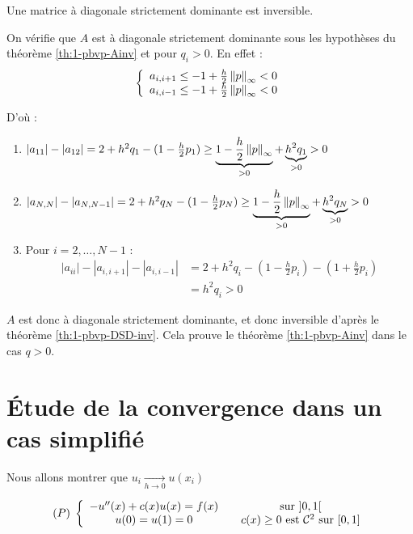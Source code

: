     \begin{ftheo}
        Une matrice à diagonale strictement dominante est inversible.
        \label{th:1-pbvp-DSD-inv}
    \end{ftheo}

    On vérifie que $A$ est à diagonale strictement dominante sous les hypothèses
    du théorème \ref{th:1-pbvp-Ainv} et pour $q_i>0$. En effet :
    \[
        \left\lbrace
        \begin{array}{c}
            a_{i,i+1} \leq -1 + \frac{h}{2} \left\lVert p\right\rVert_\infty < 0 \\
            a_{i,i-1} \leq -1 + \frac{h}{2} \left\lVert p\right\rVert_\infty < 0
        \end{array}
        \right.
    \]

    D'où :
    \begin{enumerate}[label=*]
        \item $|a_{11}| - |a_{12}| = 2 + h^2 q_1 - (1 - \frac{h}{2}p_1) \geq
            \underbrace{1 - \frac{h}{2} \left\lVert p\right\rVert_\infty}_{>0} + \underbrace{h^2 q_1}_{>0} > 0 $

        \item $|a_{N,N}| - |a_{N,N-1}| = 2 + h^2 q_N - (1 - \frac{h}{2}p_N) \geq
            \underbrace{1 - \frac{h}{2} \left\lVert p\right\rVert_\infty}_{>0} + \underbrace{h^2 q_N}_{>0} > 0 $

        \item Pour $i = 2, \dots, N-1$ :
            \begin{align*}
                |a_{ii}| - |a_{i,i+1}| - |a_{i,i-1}| & = 2 + h^2 q_i - (1-\frac{h}{2}p_i) - (1 + \frac{h}{2}p_i) \\
                & = h^2 q_i > 0
            \end{align*}
    \end{enumerate}

    $A$ est donc à diagonale strictement dominante, et donc inversible d'après
    le théorème \ref{th:1-pbvp-DSD-inv}. Cela prouve le théorème \ref{th:1-pbvp-Ainv} dans le cas $q > 0$.

\section{Étude de la convergence dans un cas simplifié}
Nous allons montrer que $u_i \underset{h\to0}{\longrightarrow} u(x_i)$

\[
    (P) \;
    \left\lbrace
    \begin{array}{ccc}
        -u''(x) + c(x) u(x) = f(x) & & \text{sur } ]0,1[ \\
            u(0) = u(1) = 0 & & c(x) \geq 0 \text{ est $\mathcal{C}^2$ sur $[0,1]$}
    \end{array}
    \right.
\]

